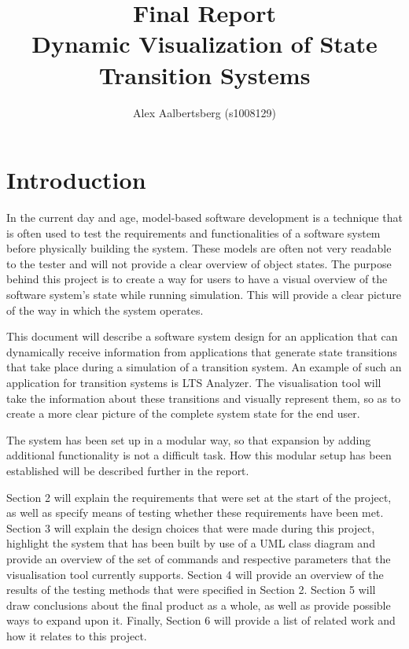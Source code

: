 \documentclass[11pt,a4paper]{article}
\begin{document}
\title{Final Report \\ \vspace{2mm} {\large Dynamic Visualization of State Transition Systems}}
\author{Alex Aalbertsberg (s1008129)}
\maketitle

\clearpage
\tableofcontents

\clearpage
\section{Introduction}


In the current day and age, model-based software development is a technique that is often used to test the requirements and functionalities of a software system before physically building the system. These models are often not very readable to the tester and will not provide a clear overview of object states. The purpose behind this project is to create a way for users to have a visual overview of the software system's state while running simulation. This will provide a clear picture of the way in which the system operates.

This document will describe a software system design for an application that can dynamically receive information from applications that generate state transitions that take place during a simulation of a transition system. An example of such an application for transition systems is LTS Analyzer. The visualisation tool will take the information about these transitions and visually represent them, so as to create a more clear picture of the complete system state for the end user.

The system has been set up in a modular way, so that expansion by adding additional functionality is not a difficult task. How this modular setup has been established will be described further in the report.

Section 2 will explain the requirements that were set at the start of the project, as well as specify means of testing whether these requirements have been met. Section 3 will explain the design choices that were made during this project, highlight the system that has been built by use of a UML class diagram and provide an overview of the set of commands and respective parameters that the visualisation tool currently supports. Section 4 will provide an overview of the results of the testing methods that were specified in Section 2. Section 5 will draw conclusions about the final product as a whole, as well as provide possible ways to expand upon it. Finally, Section 6 will provide a list of related work and how it relates to this project.
\end{document}
